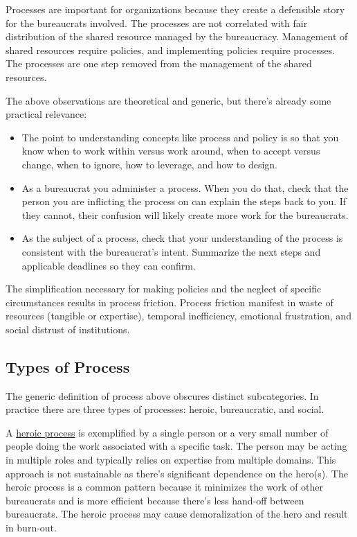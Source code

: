 Processes are important for organizations because they create a defensible story for the bureaucrats involved. The processes are not correlated with fair distribution of the shared resource managed by the bureaucracy. Management of shared resources require policies, and implementing policies require processes. The processes are one step removed from the management of the shared resources. 

The above observations are theoretical and generic, but there's already some practical relevance:
\begin{itemize}
    \item The point to understanding concepts like process and policy is so that you know when to work within versus work around, when to accept versus change, when to ignore, how to leverage, and how to design.
    \item As a bureaucrat you administer a process. When you do that, check that the person you are inflicting the process on can explain the steps back to you. If they cannot, their confusion will likely create more work for the bureaucrats. 
    \item As the subject of a process, check that your understanding of the process is consistent with the bureaucrat's intent. Summarize the next steps and applicable deadlines so they can confirm. 
\end{itemize}

The simplification necessary for making policies and the neglect of specific circumstances results in \gls{process friction}. Process friction manifest in waste of resources (tangible or expertise), temporal inefficiency, emotional frustration, and social distrust of institutions.



\subsection*{Types of Process}
The generic definition of process above obscures distinct subcategories. In practice there are three types of processes: heroic, bureaucratic, and social.

A \underline{heroic process} is exemplified by a single person or a very small number of people doing the work associated with a specific task. The person may be acting in multiple roles and typically relies on expertise from multiple domains. This approach is not sustainable as there's significant dependence on the hero(s). The heroic process is a common pattern because it minimizes the work of other bureaucrats and is more efficient because there's less hand-off between bureaucrats. The heroic process may cause demoralization of the hero and result in burn-out. 

